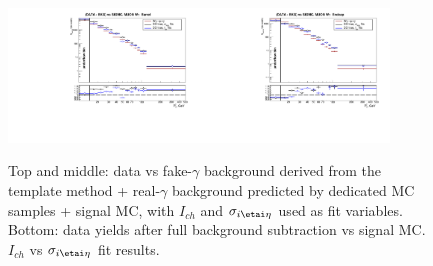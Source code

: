 \begin{figure}[htb]
\begin{center}
\includegraphics[width=0.45\textwidth]{../figs/figs_v11/MUON_WGamma/PrepareYields/c_BkgSubtrDATAvsSIGMC_c_MUON_WGamma__UNblind__Barrel__phoEt.pdf}\includegraphics[width=0.45\textwidth]{../figs/figs_v11/MUON_WGamma/PrepareYields/c_BkgSubtrDATAvsSIGMC_c_MUON_WGamma__UNblind__Endcap__phoEt.pdf}\\
  \caption{Top and middle: data vs fake-$\gamma$ background derived from the template method + real-$\gamma$ background predicted by dedicated MC samples + signal MC, with $I_{ch}$ and $\sigma_{i\etai\eta}$ used as fit variables. Bottom: data yields after full background subtraction vs signal MC. $I_{ch}$ vs $\sigma_{i\etai\eta}$ fit results. }
  \label{fig:DDvsMC_Wg_Data_MUON}
  \end{center}
\end{figure}

